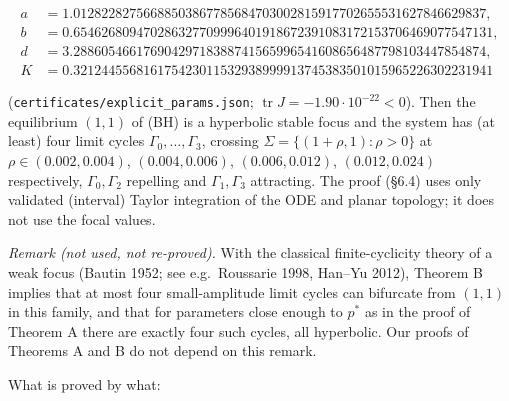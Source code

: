 \documentclass[11pt,a4paper]{report}
\begin{document}
\[\begin{aligned}
a&=1.01282282756688503867785684703002815917702655531627846629837,\\
b&=0.654626809470286327709996401918672391083172153706469077547131,\\
d&=3.28860546617690429718388741565996541608656487798103447854874,\\
K&=0.321244556816175423011532938999913745383501015965226302231941
\end{aligned}\]

(\texttt{certificates/explicit\_params.json}; \(\operatorname{tr}J=-1.90\cdot10^{-22}<0\)). Then the equilibrium \((1,1)\)
of (BH) is a hyperbolic stable focus and the system has (at least) four limit cycles
\(\Gamma_0,\dots,\Gamma_3\), crossing \(\Sigma=\{(1+\rho,1):\rho>0\}\) at \(\rho\in(0.002,0.004)\),
\((0.004,0.006)\), \((0.006,0.012)\), \((0.012,0.024)\) respectively, \(\Gamma_0,\Gamma_2\) repelling and
\(\Gamma_1,\Gamma_3\) attracting. The proof (§6.4) uses only validated (interval) Taylor integration of the ODE
and planar topology; it does not use the focal values.

\emph{Remark (not used, not re-proved).} With the classical finite-cyclicity theory of a weak focus (Bautin 1952;
see e.g.~Roussarie 1998, Han--Yu 2012), Theorem B implies that at most four small-amplitude limit cycles can
bifurcate from \((1,1)\) in this family, and that for parameters close enough to \(p^*\) as in the proof of
Theorem A there are exactly four such cycles, all hyperbolic. Our proofs of Theorems A and B do not depend on
this remark.

What is proved by what:
\end{document}
